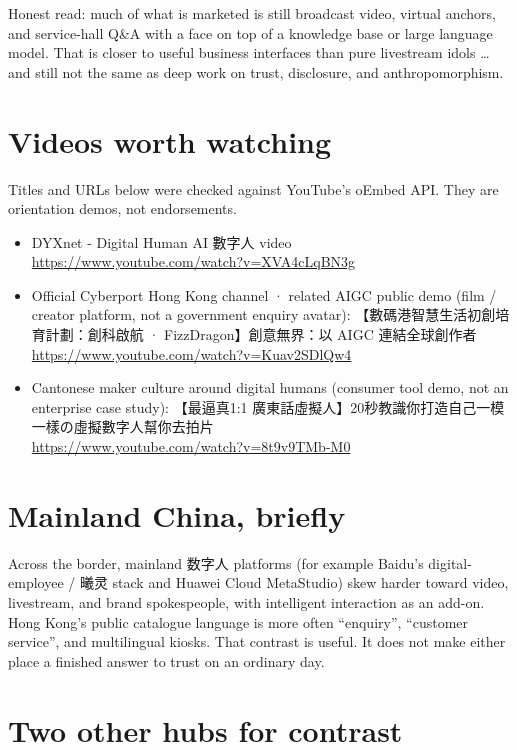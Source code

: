 \documentclass[11pt,a4paper]{article}
\begin{document}
Honest read: much of what is marketed is still broadcast video, virtual anchors, and service-hall Q\&A with a face on top of a knowledge base or large language model.
That is closer to useful business interfaces than pure livestream idols \ldots{} and still not the same as deep work on trust, disclosure, and anthropomorphism.

\section*{Videos worth watching}

Titles and URLs below were checked against YouTube's oEmbed API. They are orientation demos, not endorsements.

\begin{itemize}
  \item DYXnet - Digital Human AI 數字人 video \\
    \url{https://www.youtube.com/watch?v=XVA4cLqBN3g}
  \item Official Cyberport Hong Kong channel · related AIGC public demo (film / creator platform, not a government enquiry avatar):
    【數碼港智慧生活初創培育計劃：創科啟航 · FizzDragon】創意無界：以 AIGC 連結全球創作者 \\
    \url{https://www.youtube.com/watch?v=Kuav2SDlQw4}
  \item Cantonese maker culture around digital humans (consumer tool demo, not an enterprise case study):
    【最逼真1:1 廣東話虛擬人】20秒教識你打造自己一模一樣の虛擬數字人幫你去拍片 \\
    \url{https://www.youtube.com/watch?v=8t9v9TMb-M0}
\end{itemize}

\section*{Mainland China, briefly}

Across the border, mainland 数字人 platforms (for example Baidu's digital-employee / 曦灵 stack and Huawei Cloud MetaStudio) skew harder toward video, livestream, and brand spokespeople, with intelligent interaction as an add-on.
Hong Kong's public catalogue language is more often ``enquiry'', ``customer service'', and multilingual kiosks.
That contrast is useful. It does not make either place a finished answer to trust on an ordinary day.

\section*{Two other hubs for contrast}
\end{document}
